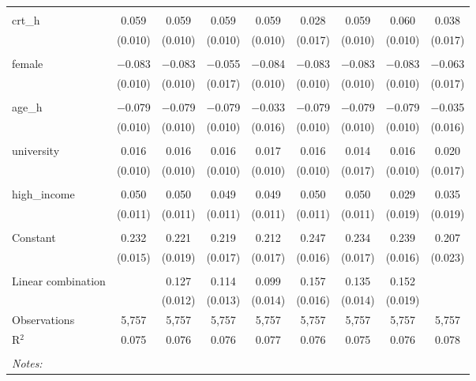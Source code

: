 \begin{table}[!htbp]
\begin{tabular}{@{\extracolsep{5pt}}lcccccccc}
  & & & & & & & & \\ 
 crt\_h & 0.059 & 0.059 & 0.059 & 0.059 & 0.028 & 0.059 & 0.060 & 0.038 \\ 
  & (0.010) & (0.010) & (0.010) & (0.010) & (0.017) & (0.010) & (0.010) & (0.017) \\ 
  & & & & & & & & \\ 
 female & $-$0.083 & $-$0.083 & $-$0.055 & $-$0.084 & $-$0.083 & $-$0.083 & $-$0.083 & $-$0.063 \\ 
  & (0.010) & (0.010) & (0.017) & (0.010) & (0.010) & (0.010) & (0.010) & (0.017) \\ 
  & & & & & & & & \\ 
 age\_h & $-$0.079 & $-$0.079 & $-$0.079 & $-$0.033 & $-$0.079 & $-$0.079 & $-$0.079 & $-$0.035 \\ 
  & (0.010) & (0.010) & (0.010) & (0.016) & (0.010) & (0.010) & (0.010) & (0.016) \\ 
  & & & & & & & & \\ 
 university & 0.016 & 0.016 & 0.016 & 0.017 & 0.016 & 0.014 & 0.016 & 0.020 \\ 
  & (0.010) & (0.010) & (0.010) & (0.010) & (0.010) & (0.017) & (0.010) & (0.017) \\ 
  & & & & & & & & \\ 
 high\_income & 0.050 & 0.050 & 0.049 & 0.049 & 0.050 & 0.050 & 0.029 & 0.035 \\ 
  & (0.011) & (0.011) & (0.011) & (0.011) & (0.011) & (0.011) & (0.019) & (0.019) \\ 
  & & & & & & & & \\ 
 Constant & 0.232 & 0.221 & 0.219 & 0.212 & 0.247 & 0.234 & 0.239 & 0.207 \\ 
  & (0.015) & (0.019) & (0.017) & (0.017) & (0.016) & (0.017) & (0.016) & (0.023) \\ 
  & & & & & & & & \\ 
Linear combination &   & 0.127 & 0.114 & 0.099 & 0.157 & 0.135 & 0.152 &  \\ 
 &  & (0.012) & (0.013) & (0.014) & (0.016) & (0.014) & (0.019) &  \\ 
Observations & 5,757 & 5,757 & 5,757 & 5,757 & 5,757 & 5,757 & 5,757 & 5,757 \\ 
R$^{2}$ & 0.075 & 0.076 & 0.076 & 0.077 & 0.076 & 0.075 & 0.076 & 0.078 \\ 
\hline \\[-1.8ex] 
\textit{Notes:} & \multicolumn{8}{l}{} \\ 
\end{tabular} 
\end{table} 
